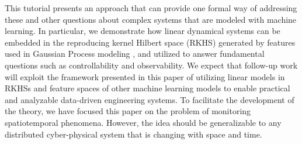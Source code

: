 \documentclass[letterpaper,12pt,peerreviewca,draftcls]{IEEEtran}
\begin{document}
This tutorial presents an approach that can provide one formal way of addressing these and other questions about complex systems that are modeled with machine learning. In particular, we demonstrate how linear dynamical systems can be embedded in the reproducing kernel Hilbert space (RKHS) \cite{schoelkopf01kernelbased,ams:cucker,kingravi2012reproducing} generated by features used in Gaussian Process modeling \cite{Liu2018csmtutorial,rasmussen2006gaussian}, %
and utilized to answer fundamental questions such as controllability and observability. 
We expect that follow-up work will exploit the framework presented in this paper of utilizing linear models in RKHSs and feature spaces of other machine learning models to enable practical and analyzable data-driven engineering systems. To facilitate the development of the theory, we have focused this paper on the problem of monitoring spatiotemporal phenomena. However, the idea should be generalizable to any distributed cyber-physical system that is changing with space and time. 
\end{document}
